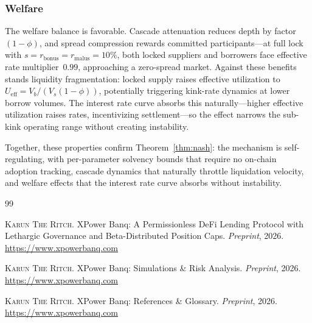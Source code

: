 \documentclass[10pt,a4paper,twocolumn]{article}
\begin{document}
\subsubsection{Welfare}

The welfare balance is favorable. Cascade attenuation reduces depth by factor~$(1{-}\phi)$, and spread compression rewards committed participants---at full lock with $s = r_{\text{bonus}} = r_{\text{malus}} = 10\%$, both locked suppliers and borrowers face effective rate multiplier~$0.99$, approaching a zero-spread market. Against these benefits stands liquidity fragmentation: locked supply raises effective utilization to $U_{\text{eff}} = V_b / (V_s(1{-}\phi))$, potentially triggering kink-rate dynamics at lower borrow volumes. The interest rate curve absorbs this naturally---higher effective utilization raises rates, incentivizing settlement---so the effect narrows the sub-kink operating range without creating instability.

Together, these properties confirm Theorem~\ref{thm:nash}: the mechanism is self-regulating, with per-parameter solvency bounds that require no on-chain adoption tracking, cascade dynamics that naturally throttle liquidation velocity, and welfare effects that the interest rate curve absorbs without instability.

\ifbundle\else
\begin{thebibliography}{99}

\textsc{Karun The Ritch}.
\newblock XPower Banq: A Permissionless DeFi Lending Protocol with Lethargic Governance and Beta-Distributed Position Caps.
\newblock \emph{Preprint}, 2026.
\newblock \url{https://www.xpowerbanq.com}

\textsc{Karun The Ritch}.
\newblock XPower Banq: Simulations \& Risk Analysis.
\newblock \emph{Preprint}, 2026.
\newblock \url{https://www.xpowerbanq.com}

\textsc{Karun The Ritch}.
\newblock XPower Banq: References \& Glossary.
\newblock \emph{Preprint}, 2026.
\newblock \url{https://www.xpowerbanq.com}

\end{thebibliography}
\fi

\ifbundle\else
\end{document}
